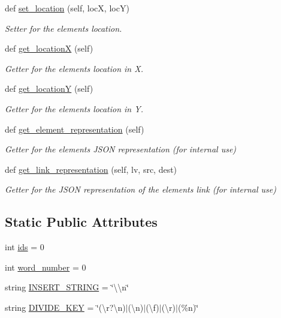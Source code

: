 \begin{DoxyCompactItemize}
def \hyperlink{classbridges_1_1element_1_1_element_aa1387621f7afa6b6f6acd052a1126320}{set\+\_\+location} (self, locX, locY)
\begin{DoxyCompactList}\small\item\em Setter for the element\textquotesingle{}s location. \end{DoxyCompactList}\item 
def \hyperlink{classbridges_1_1element_1_1_element_aa921953dab3cec5253e813bb1709895a}{get\+\_\+locationX} (self)
\begin{DoxyCompactList}\small\item\em Getter for the element\textquotesingle{}s location in X. \end{DoxyCompactList}\item 
def \hyperlink{classbridges_1_1element_1_1_element_a108f62843d084beaf5fcf5fd202853c5}{get\+\_\+locationY} (self)
\begin{DoxyCompactList}\small\item\em Getter for the element\textquotesingle{}s location in Y. \end{DoxyCompactList}\item 
def \hyperlink{classbridges_1_1element_1_1_element_a511fbc6323616d806ae0ae33010f4654}{get\+\_\+element\+\_\+representation} (self)
\begin{DoxyCompactList}\small\item\em Getter for the element\textquotesingle{}s J\+S\+ON representation (for internal use) \end{DoxyCompactList}\item 
def \hyperlink{classbridges_1_1element_1_1_element_a8f220d7b81c0e0dd84b9eff33ade76b9}{get\+\_\+link\+\_\+representation} (self, lv, src, dest)
\begin{DoxyCompactList}\small\item\em Getter for the J\+S\+ON representation of the element\textquotesingle{}s link (for internal use) \end{DoxyCompactList}\end{DoxyCompactItemize}
\subsection*{Static Public Attributes}
\begin{DoxyCompactItemize}
\item 
int \hyperlink{classbridges_1_1element_1_1_element_a61f02c915a65554b76dd6534e5a4d834}{ids} = 0
\item 
int \hyperlink{classbridges_1_1element_1_1_element_acd203dd3944abb6407aa37957b5f07ce}{word\+\_\+number} = 0
\item 
string \hyperlink{classbridges_1_1element_1_1_element_a21b1bf28ba668dc05f90901e827eda9a}{I\+N\+S\+E\+R\+T\+\_\+\+S\+T\+R\+I\+NG} = \char`\"{}\textbackslash{}\textbackslash{}n\char`\"{}
\item 
string \hyperlink{classbridges_1_1element_1_1_element_a48cd67c58c2b685732f4e751f539eed0}{D\+I\+V\+I\+D\+E\+\_\+\+K\+EY} = \char`\"{}(\textbackslash{}r?\textbackslash{}n)$\vert$(\textbackslash{}n)$\vert$(\textbackslash{}f)$\vert$(\textbackslash{}r)$\vert$(\%n)\char`\"{}
\end{DoxyCompactItemize}


